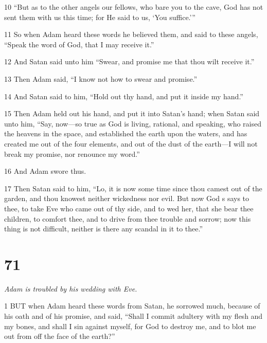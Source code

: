\par 10 “But as to the other angels our fellows, who bare you to the cave, God has not sent them with us this time; for He said to us, ‘You suffice.’”

\par 11 So when Adam heard these words he believed them, and said to these angels, “Speak the word of God, that I may receive it.”

\par 12 And Satan said unto him “Swear, and promise me that thou wilt receive it.”

\par 13 Then Adam said, “I know not how to swear and promise.”

\par 14 And Satan said to him, “Hold out thy hand, and put it inside my hand.”

\par 15 Then Adam held out his hand, and put it into Satan's hand; when Satan said unto him, “Say, now—so true as God is living, rational, and speaking, who raised the heavens in the space, and established the earth upon the waters, and has created me out of the four elements, and out of the dust of the earth—I will not break my promise, nor renounce my word.”

\par 16 And Adam swore thus.

\par 17 Then Satan said to him, “Lo, it is now some time since thou camest out of the garden, and thou knowest neither wickedness nor evil. But now God s says to thee, to take Eve who came out of thy side, and to wed her, that she bear thee children, to comfort thee, and to drive from thee trouble and sorrow; now this thing is not difficult, neither is there any scandal in it to thee.”

\chapter{71}

\par \textit{Adam is troubled by his wedding with Eve.}

\par 1 BUT when Adam heard these words from Satan, he sorrowed much, because of his oath and of his promise, and said, “Shall I commit adultery with my flesh and my bones, and shall I sin against myself, for God to destroy me, and to blot me out from off the face of the earth?”

